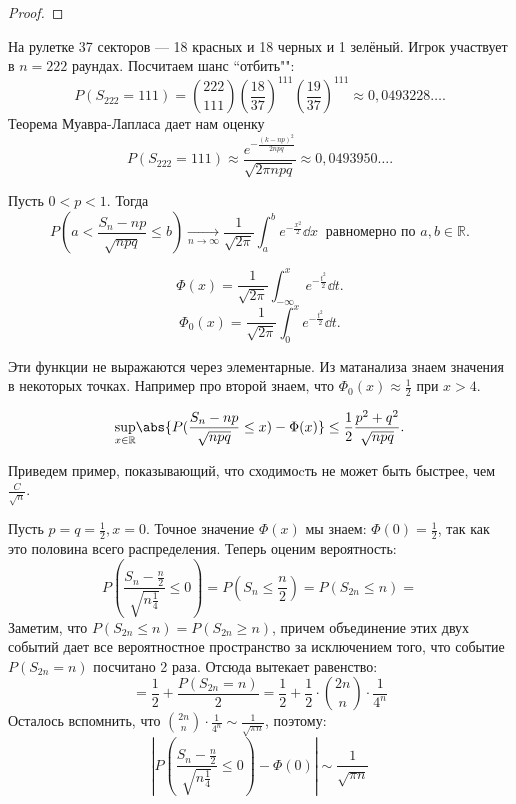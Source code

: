 \begin{proof}
 \end{proof}

 \begin{example}На рулетке 37 секторов --- 18 красных и 18 черных и 1 зелёный. Игрок участвует в $n = 222$ раундах. Посчитаем шанс ``отбить"":
     $$P(S_{222} = 111) = \binom{222}{111}(\frac{18}{37})^{111}(\frac{19}{37})^{111} \approx 0,0493228\ldots.$$
     Теорема Муавра-Лапласа дает нам оценку
    $$ P(S_{222} = 111)\approx \frac{e^{-\frac{(k - np)^2}{2npq}}}{\sqrt{2\pi npq}}\approx 0,0493950\ldots.$$
 \end{example}

 \begin{theorem}\label{th:ipt}
     Пусть $0<p<1$.
     Тогда $$P(a< \frac{S_n - np}{\sqrt{npq}}\le b) \underset{n\rightarrow\infty}{\rightarrow} \frac{1}{\sqrt{2\pi}} \int_a^b e^{-\frac{x^2}{2}}\dd x \ \text{ равномерно по } a, b\in \mathbb{R}.$$
 \end{theorem}

\begin{notation}
$$\Phi(x) = \frac{1}{\sqrt{2\pi}} \int_{-\infty}^x e^{-\frac{t^2}{2}}\dd t.$$
$$\Phi_0(x) = \frac{1}{\sqrt{2\pi}} \int_{0}^x e^{-\frac{t^2}{2}}\dd t.$$
\end{notation}

Эти функции не выражаются через элементарные. Из матанализа знаем значения в некоторых точках. Например про второй знаем, что $\Phi_0(x) \approx \frac{1}{2}$ при $x > 4$. 

 \begin{theorem}
     $$\underset{x\in\mathbb{R}}{\sup}\abs{P( \frac{S_n - np}{\sqrt{npq}} \le x) - \Phi(x)} \le
         \frac{1}{2}\frac{p^2 + q^2}{\sqrt{npq}}.$$
 \end{theorem}

\begin{example} 
    Приведем пример, показывающий, что сходимоcть не может быть быстрее, чем $\frac{C}{\sqrt{n}}$.
    
    Пусть $p=q=\frac{1}{2}, x = 0$. Точное значение $\Phi(x)$ мы знаем: $\Phi(0) = \frac{1}{2}$, так как это половина всего распределения. Теперь оценим вероятность: \[P\left(\frac{S_n - \frac{n}{2}}{\sqrt{n\frac{1}{4}}} \le 0\right) = P\left(S_n \le \frac{n}{2}\right) =  P(S_{2n} \le n) = \]
    Заметим, что $P(S_{2n} \le n) = P(S_{2n} \ge n)$,  причем объединение этих двух событий дает все вероятностное пространство за исключением того, что событие $P(S_{2n} = n)$ посчитано 2 раза. Отсюда вытекает равенство: \[ = \frac{1}{2} + \frac{P(S_{2n} = n)}{2} = \frac{1}{2} + \frac{1}{2} \cdot \binom{2n}{n}\cdot\frac{1}{4^n} \]
    Осталось вспомнить, что $\binom{2n}{n}\cdot\frac{1}{4^n} \sim \frac{1}{\sqrt{\pi n}}$, поэтому: \[\left|P\left(\frac{S_n - \frac{n}{2}}{\sqrt{n\frac{1}{4}}} \le 0\right) - \Phi(0)\right| \sim \frac{1}{\sqrt{\pi n}} \]
\end{example}

